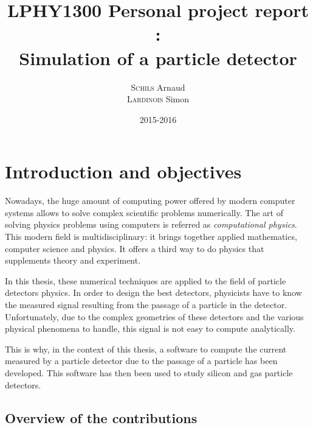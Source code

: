 \documentclass[11pt]{article}
\title{LPHY1300 Personal project report :\\ Simulation of a particle detector}
\author{\textsc{Schils} Arnaud\\ \textsc{Lardinois} Simon}
\date{2015-2016}
\begin{document}
\maketitle

\newpage


\renewcommand\cftsecleader{\cftdotfill{\cftdotsep}}
\renewcommand{\contentsname}{Table of contents}
\tableofcontents


\newpage
\section*{Introduction and objectives}

	Nowadays, the huge amount of computing power offered by modern computer systems allows
	to solve complex scientific problems numerically. The art of solving physics problems using
	computers is referred as \textit{computational physics}. This modern field
	is multidisciplinary: it brings together applied mathematics,
	computer science and physics. It offers a third way to do physics
	that supplements theory and experiment.

	In this thesis, these numerical techniques are applied to the field of particle
	detectors physics. In order to design the best detectors,
	physicists have to know the measured signal resulting from the passage of a particle
	in the detector. Unfortunately, due to the complex geometries of these detectors
	and the various physical phenomena to handle, this signal is not easy
	to compute analytically.

	This is why, in the context of this thesis, a software  to compute the current measured
	by a particle detector due to the passage of a particle has been developed.
	This software has then been used to study silicon and gas particle detectors.


	\subsection*{Overview of the contributions}
\end{document}
